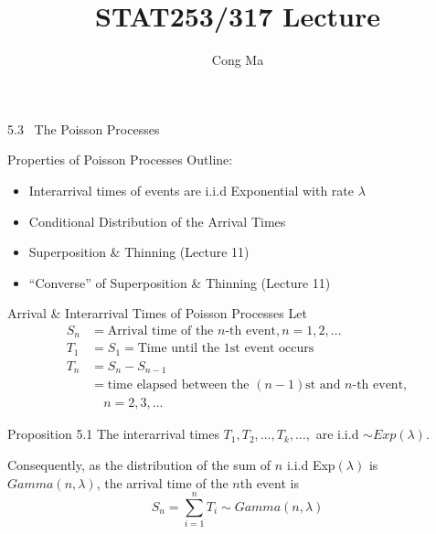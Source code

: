 \documentclass[letterpaper,handout, mathserif]{beamer}
\title{STAT253/317 Lecture \chapnum} \date{} \author{Cong Ma}
\begin{document}
\begin{frame}\maketitle\begin{center}5.3 \ The Poisson Processes\end{center}\end{frame}
\begin{frame}{Properties of Poisson Processes}
Outline:
\begin{itemize}
\item Interarrival times of events are i.i.d Exponential with rate $\lambda$
\item Conditional Distribution of the Arrival Times
\item Superposition \& Thinning \dotfill (Lecture 11)
\item ``Converse'' of Superposition \& Thinning \dotfill (Lecture 11)
\end{itemize}
\end{frame}
\begin{frame}{Arrival \& Interarrival Times of Poisson Processes}
Let
\begin{align*}
S_n &=\text{Arrival time of the } n\text{-th event},n=1,2,\ldots\\
T_1%
   &=S_1=\text{Time until the 1st event occurs}\\
T_n%
   &=S_n-S_{n-1}\\
   &=\text{time elapsed between the $(n-1)$st and $n$-th event},\\
   &\quad n=2,3,\ldots
\end{align*}
\begin{block}{Proposition 5.1}
The interarrival times $T_1,T_2,\ldots,T_k,\ldots,$ are i.i.d $\sim Exp(\lambda)$.\bigskip
\end{block}
Consequently, as the distribution of the sum of $n$ i.i.d Exp$(\lambda)$ is $Gamma(n,\lambda)$,
the arrival time of the $n$th event is
 $$S_n =\sum_{i=1}^n T_i\sim Gamma(n,\lambda)$$
\end{frame}
\end{document}
